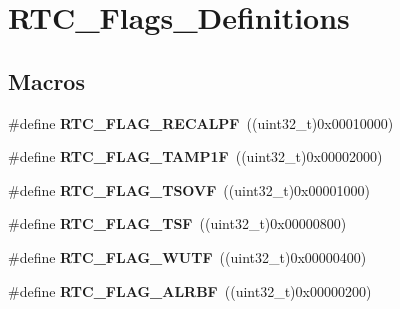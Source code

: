 \hypertarget{group___r_t_c___flags___definitions}{\section{R\-T\-C\-\_\-\-Flags\-\_\-\-Definitions}
\label{group___r_t_c___flags___definitions}
}
\subsection*{Macros}
\begin{DoxyCompactItemize}
\item 
\hypertarget{group___r_t_c___flags___definitions_ga01cba90a7ca51a928f72d28b6fe0d2ac}{\#define {\bfseries R\-T\-C\-\_\-\-F\-L\-A\-G\-\_\-\-R\-E\-C\-A\-L\-P\-F}~((uint32\-\_\-t)0x00010000)}\label{group___r_t_c___flags___definitions_ga01cba90a7ca51a928f72d28b6fe0d2ac}

\item 
\hypertarget{group___r_t_c___flags___definitions_ga3abf1af75c6ae88ddabe4b8a26634f99}{\#define {\bfseries R\-T\-C\-\_\-\-F\-L\-A\-G\-\_\-\-T\-A\-M\-P1\-F}~((uint32\-\_\-t)0x00002000)}\label{group___r_t_c___flags___definitions_ga3abf1af75c6ae88ddabe4b8a26634f99}

\item 
\hypertarget{group___r_t_c___flags___definitions_ga74656ea8ff41be61a3734dc27367e039}{\#define {\bfseries R\-T\-C\-\_\-\-F\-L\-A\-G\-\_\-\-T\-S\-O\-V\-F}~((uint32\-\_\-t)0x00001000)}\label{group___r_t_c___flags___definitions_ga74656ea8ff41be61a3734dc27367e039}

\item 
\hypertarget{group___r_t_c___flags___definitions_ga9b9ac7de7718bfe0ff77e1fd1193744b}{\#define {\bfseries R\-T\-C\-\_\-\-F\-L\-A\-G\-\_\-\-T\-S\-F}~((uint32\-\_\-t)0x00000800)}\label{group___r_t_c___flags___definitions_ga9b9ac7de7718bfe0ff77e1fd1193744b}

\item 
\hypertarget{group___r_t_c___flags___definitions_gafcadab331b0193e82c7f6b037044f194}{\#define {\bfseries R\-T\-C\-\_\-\-F\-L\-A\-G\-\_\-\-W\-U\-T\-F}~((uint32\-\_\-t)0x00000400)}\label{group___r_t_c___flags___definitions_gafcadab331b0193e82c7f6b037044f194}

\item 
\hypertarget{group___r_t_c___flags___definitions_gabb7bd65e83b346f42e28091ef1e643f5}{\#define {\bfseries R\-T\-C\-\_\-\-F\-L\-A\-G\-\_\-\-A\-L\-R\-B\-F}~((uint32\-\_\-t)0x00000200)}\label{group___r_t_c___flags___definitions_gabb7bd65e83b346f42e28091ef1e643f5}


\end{DoxyCompactItemize}
